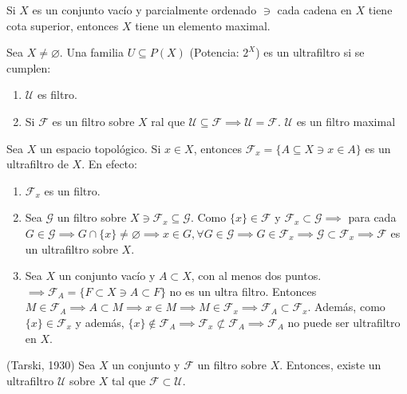 \documentclass[a4paper, 12pt]{article}
\begin{document}
\begin{lema}[De Zorn]
    Si $X$ es un conjunto vacío y parcialmente ordenado $\ni$ cada cadena en $X$ tiene cota superior, entonces $X$ tiene un elemento maximal. 
\end{lema}

\begin{definicion}
    Sea $X\neq \varnothing$. Una familia $U\subseteq P(X)$ (Potencia: $2^X$) es un ultrafiltro si se cumplen: 
    \begin{enumerate}
        \item $\mathcal{U}$ es filtro. 
        \item Si $\mathcal{F}$ es un filtro sobre $X$ ral que $\mathcal{U}\subseteq \mathcal{F}\implies \mathcal{U}= \mathcal{F}$.  $\mathcal{U}$ es un filtro maximal
    \end{enumerate} 
\end{definicion}
\begin{ejemplo}
    Sea $X$ un espacio topológico. Si $x\in X$, entonces $\mathcal{F}_x = \{A\subseteq X\ni x\in A\}$ es un ultrafiltro de $X$. En efecto: 
    \begin{enumerate}
        \item $\mathcal{F}_x$ es un filtro. 
        \item Sea $\mathcal{G}$ un filtro sobre $X\ni \mathcal{F}_x\subseteq \mathcal{G}$. Como $\{x\}\in \mathcal{F}$ y $\mathcal{F}_x\subset \mathcal{G}\implies $ para cada $G\in \mathcal{G}\implies G\cap\{x\}\neq \varnothing\implies x\in G,\forall G\in \mathcal{G}\implies G\in \mathcal{F}_x\implies \mathcal{G}\subset \mathcal{F}_x\implies \mathcal{F}$ es un ultrafiltro sobre $X$.
        \item  Sea $X$ un conjunto vacío y $A\subset X$, con al menos dos puntos. $\implies \mathcal{F}_A=\{F\subset X\ni A\subset F\}$ no es un ultra filtro. Entonces $M\in \mathcal{F}_A\implies A\subset M\implies x\in M \implies M\in \mathcal{F}_x\implies \mathcal{F}_A\subset \mathcal{F}_x$. Además, como $\{x\}\in \mathcal{F}_x$ y además, $\{x\}\not\in \mathcal{F}_A\implies \mathcal{F}_x\not\subset \mathcal{F}_A\implies \mathcal{F}_A$ no puede ser ultrafiltro en $X$. 
    \end{enumerate}
\end{ejemplo}

\begin{teorema} (Tarski, 1930)
    Sea $X$ un conjunto y $\mathcal{F}$ un filtro sobre $X$. Entonces, existe un ultrafiltro $\mathcal{U}$ sobre $X$ tal que $\mathcal{F}\subset \mathcal{U}$. 

    
\end{teorema}
\end{document}
